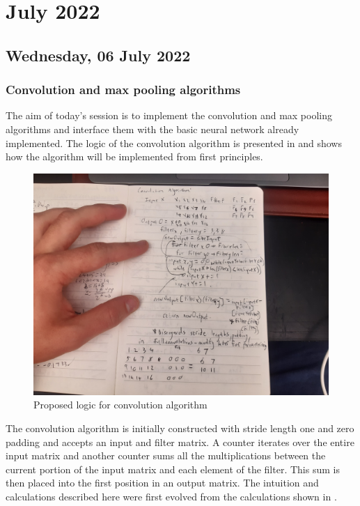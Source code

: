 \chapter[2022 July]{July 2022}

\section[2022/07/06]{Wednesday, 06 July 2022}

\subsection{Convolution and max pooling algorithms}

The aim of today's session is to implement the convolution and max pooling algorithms and interface them with the basic neural network already implemented. The logic of the convolution algorithm is presented in  and shows how the algorithm will be implemented from first principles. \\

\begin{figure}[h]
    \centering
    \includegraphics[width=1.0\linewidth]{figures/conv_alg_labbook.jpg}
    \caption{Proposed logic for convolution algorithm}
    \label{fig:conv_alg_labbook}
\end{figure}

The convolution algorithm is initially constructed with stride length one and zero padding and accepts an input and filter matrix. A counter iterates over the entire input matrix and another counter sums all the multiplications between the current portion of the input matrix and each element of the filter. This sum is then placed into the first position in an output matrix. The intuition and calculations described here were first evolved from the calculations shown in .

